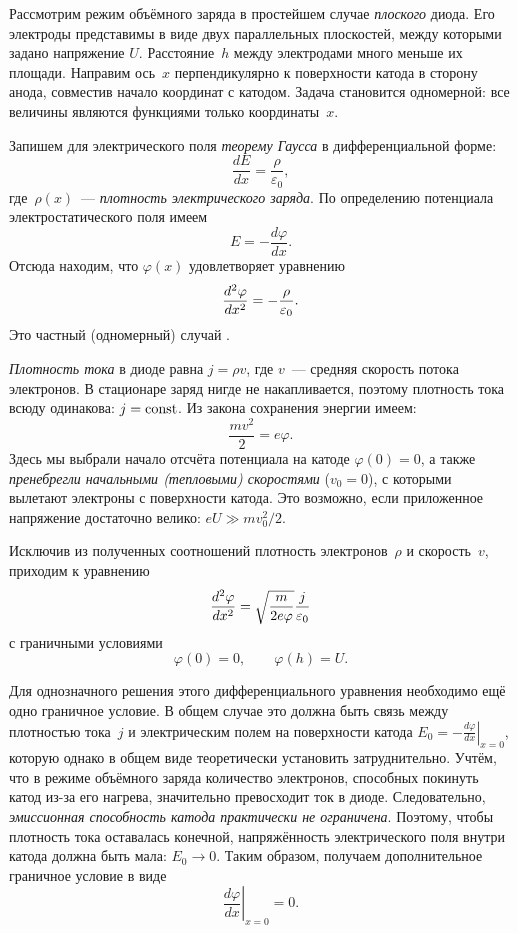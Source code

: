 
Рассмотрим режим объёмного заряда в простейшем случае \emph{плоского}
диода. Его электроды представимы в виде двух параллельных плоскостей,
между которыми задано напряжение $U$. Расстояние~$h$ между электродами много
меньше их площади. Направим ось~$x$ перпендикулярно к поверхности катода
в сторону анода, совместив начало координат с катодом. Задача
становится одномерной: все величины являются функциями только координаты~$x$.

Запишем для электрического поля \emph{теорему Гаусса} в дифференциальной
форме:
\[
\frac{dE}{dx} = \frac{\rho}{\varepsilon_0},
\]
где~$\rho(x)$~--- \emph{плотность электрического заряда}. По определению
потенциала электростатического поля имеем
\[
E = -\frac{d\varphi}{dx}.
\]
Отсюда находим, что $\varphi(x)$ удовлетворяет уравнению
\begin{equation}
    \eqmark{3.14}
    \frac{d^2\varphi}{dx^2}=-\frac{\rho}{\varepsilon_0}.
\end{equation}
Это частный (одномерный) случай .

\emph{Плотность тока} в диоде равна $j=\rho v$, где $v$~---
средняя скорость потока электронов. В стационаре заряд нигде не накапливается,
поэтому плотность тока всюду одинакова: $j=\mathrm{const}$. Из закона сохранения
энергии имеем:
\begin{equation*}
    \frac{mv^2}{2}=e\varphi.
\end{equation*}
Здесь мы выбрали начало отсчёта потенциала на катоде $\varphi(0)=0$, а также
\emph{пренебрегли начальными (тепловыми) скоростями} ($v_0=0$),
с которыми вылетают электроны с поверхности катода. Это возможно, если
приложенное напряжение достаточно велико: $eU\gg mv_0^2/2$.

Исключив из полученных соотношений плотность электронов~$\rho$ и скорость~$v$,
приходим к уравнению
\begin{equation}
    \eqmark{3.15}
    \frac{d^2\varphi}{dx^2}=\sqrt{\frac{m}{2e\varphi}} \frac{j}{\varepsilon_0}
\end{equation}
с граничными условиями
\begin{equation*}
 \varphi(0)=0,\qquad \varphi(h)=U.
\end{equation*}

Для однозначного решения этого дифференциального уравнения необходимо ещё одно
граничное условие. В общем случае это должна быть связь между плотностью
тока~$j$ и электрическим полем на поверхности катода
$E_0 = -\left.\frac{d\varphi}{dx}\right|_{x=0}$,
которую однако в общем виде теоретически установить затруднительно.
Учтём, что в режиме объёмного заряда количество электронов, способных покинуть
катод из-за его нагрева, значительно превосходит ток в диоде.
Следовательно, \emph{эмиссионная способность катода практически не
ограничена}. Поэтому, чтобы плотность тока оставалась конечной,
напряжённость электрического поля внутри катода должна быть мала: $E_0\to 0$.
Таким образом, получаем дополнительное граничное условие в виде
\begin{equation*}
    \left.\frac{d\varphi}{dx}\right|_{x = 0}=0.
\end{equation*}

